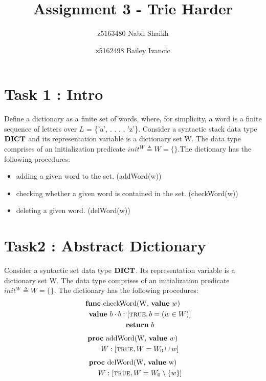 \documentclass[a4paper,10pt,fleqn]{scrartcl}   	%
\title{Assignment 3 - Trie Harder}
\author {
	z5163480 Nabil Shaikh \\
	\and
	z5162498 Bailey Ivancic
}
\newcommand{\DICT}{\pPkey{DICT}}
\begin{document}
\maketitle

\section{Task 1 : Intro }
Define a dictionary as a finite set of words, where, for simplicity, a word is a finite sequence of letters over $L$ = \{'a', . . . , 'z'\}. Consider a syntactic stack data type $\DICT$ and its representation variable is a dictionary set W. The data type comprises of an initialization predicate $init^{W}  \triangleq W=\{ \}$.The dictionary has the following procedures:

\begin{itemize}
  \item adding a given word to the set. (addWord(w))
  \item checking whether a given word is contained in the set. (checkWord(w)) 
  \item deleting a given word. (delWord(w))
\end{itemize}

\section{Task2 : Abstract Dictionary }
Consider a syntactic set data type $\DICT$. Its representation variable is a dictionary set W. The data type comprises of an initialization predicate $init^{W}  \triangleq W=\{ \}$. The dictionary has the following procedures:
\begin{gather*}
    \text{\normalfont\bfseries func} \text{ checkWord(W, } \text{\normalfont\bfseries value} \text{ $w$}) \\
    \qquad \text{\normalfont\bfseries value} \text{ $b$} \cdot{} b:[\text{\textsc{true}}, b=(w\in W)] \\
    \qquad \text{\normalfont\bfseries return} \text{ $b$}
\end{gather*}
\begin{gather*}
    \text{\normalfont\bfseries proc} \text{ addWord(W, } \text{\normalfont\bfseries value} \text{ $w$}) \\ 
    \qquad W:[\text{\textsc{true}}, W=W_0 \cup w]
\end{gather*}
\begin{gather*}
    \text{\normalfont\bfseries proc} \text{ delWord(W, } \text{\normalfont\bfseries value} \text{ w}) \\
    \qquad W:[\text{\textsc{true}}, W=W_0 \setminus \{ w \}]
\end{gather*}
\end{document}
